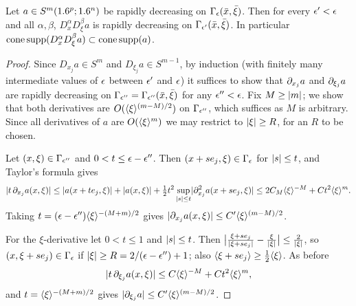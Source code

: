 \begin{lemma}\label{microlocal:lem:conesupp-derivatives}
  Let $a\in S^m(1.6^p;1.6^n)$ be rapidly decreasing on $\Gamma_\epsilon(\bar
  x,\bar\xi)$. Then for every $\epsilon'<\epsilon$ and all $\alpha,\beta$,
  $D^\alpha_xD^\beta_\xi a$ is rapidly decreasing on $\Gamma_{\epsilon'}(\bar
  x,\bar\xi)$. In particular
  $\operatorname{cone\,supp}(D^\alpha_xD^\beta_\xi a)\subset\operatorname{cone\,supp}(a)$.
\end{lemma}
\begin{proof}
  Since $D_{x_j}a\in S^m$ and $D_{\xi_j}a\in S^{m-1}$, by induction (with
  finitely many intermediate values of $\epsilon$ between $\epsilon'$ and $\epsilon$) it
  suffices to show that $\partial_{x_j}a$ and $\partial_{\xi_j}a$ are rapidly
  decreasing on $\Gamma_{\epsilon''}=\Gamma_{\epsilon''}(\bar x,\bar\xi)$ for any
  $\epsilon''<\epsilon$. Fix $M\ge\lvert m\rvert$; we show that both derivatives are
  $O(\langle \xi\rangle^{(m-M)/2})$ on $\Gamma_{\epsilon''}$, which suffices as $M$ is
  arbitrary. Since all derivatives of $a$ are $O(\langle \xi\rangle^m)$ we may restrict
  to $\lvert \xi\rvert\ge R$, for an $R$ to be chosen.

  Let $(x,\xi)\in\Gamma_{\epsilon''}$ and $0<t\le\epsilon-\epsilon''$. Then
  $(x+se_j,\xi)\in\Gamma_\epsilon$ for $\lvert s\rvert\le t$, and Taylor's formula gives
  \begin{equation*}
    \lvert t\,\partial_{x_j}a(x,\xi)\rvert\le\lvert a(x+te_j,\xi)\rvert+\lvert a(x,\xi)\rvert
    +\tfrac12t^2\sup_{\lvert s\rvert\le t}\lvert \partial^2_{x_j}a(x+se_j,\xi)\rvert
    \le 2C_M\langle \xi\rangle^{-M}+Ct^2\langle \xi\rangle^m.
  \end{equation*}
  Taking $t=(\epsilon-\epsilon'')\langle \xi\rangle^{-(M+m)/2}$ gives
  $\lvert \partial_{x_j}a(x,\xi)\rvert\le C'\langle \xi\rangle^{(m-M)/2}$.

  For the $\xi$-derivative let $0<t\le1$ and $\lvert s\rvert\le t$. Then
  $\bigl|\frac{\xi+se_j}{\lvert \xi+se_j\rvert}-\frac\xi{\lvert \xi\rvert}\bigr|\le\frac2{\lvert \xi\rvert}$,
  so $(x,\xi+se_j)\in\Gamma_\epsilon$ if $\lvert \xi\rvert\ge R=2/(\epsilon-\epsilon'')+1$; also
  $\langle \xi+se_j\rangle\ge\frac12\langle \xi\rangle$. As before
  \begin{equation*}
    \lvert t\,\partial_{\xi_j}a(x,\xi)\rvert\le C\langle \xi\rangle^{-M}+Ct^2\langle \xi\rangle^{m},
  \end{equation*}
  and $t=\langle \xi\rangle^{-(M+m)/2}$ gives $\lvert \partial_{\xi_j}a\rvert\le C'\langle \xi\rangle^{(m-M)/2}$.
\end{proof}

